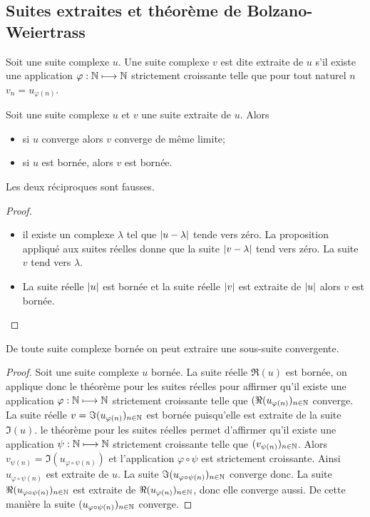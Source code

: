 \subsection{Suites extraites et théorème de Bolzano-Weiertrass}
\begin{defdef}
  Soit une suite complexe \(u\). Une suite complexe \(v\) est dite extraite de \(u\) s'il existe une application \(\varphi:\mathbb{N} \longmapsto \mathbb{N}\) strictement croissante telle que pour tout naturel \(n\) \(v_n=u_{\varphi(n)}\).
\end{defdef}
\begin{prop}
  Soit une suite complexe \(u\) et \(v\) une suite extraite de \(u\). Alors
  \begin{itemize}
  \item si \(u\) converge alors \(v\) converge de même limite;
  \item si \(u\) est bornée, alors \(v\) est bornée.
  \end{itemize}
  Les deux réciproques sont fausses.
\end{prop}
\begin{proof}
  \begin{itemize}
  \item il existe un complexe \(\lambda\) tel que \(\left\lvert u-\lambda\right\rvert\) tende vers zéro. La proposition appliqué aux suites réelles donne que la suite \(\left\lvert v-\lambda\right\rvert\) tend vers zéro. La suite \(v\) tend vers \(\lambda\).
  \item La suite réelle \(\left\lvert u\right\rvert\) est bornée et la suite réelle \(\left\lvert v\right\rvert\) est extraite de \(\left\lvert u\right\rvert\) alors \(v\) est bornée.
  \end{itemize}
\end{proof}
\begin{theo}
  De toute suite complexe bornée on peut extraire une sous-suite convergente.
\end{theo}
\begin{proof}
  Soit une suite complexe \(u\) bornée. La suite réelle \(\Re(u)\) est bornée, on applique donc le théorème pour les suites réelles pour affirmer qu'il existe une application \(\varphi:\mathbb{N} \longmapsto \mathbb{N}\) strictement croissante telle que \((\Re(u_{\varphi(n)})_{n \in \mathbb{N}}\) converge. La suite réelle \(v=\Im(u_{\varphi(n)})_{n \in \mathbb{N}}\) est bornée puisqu'elle est extraite de la suite \(\Im(u)\). le théorème pour les suites réelles permet d'affirmer qu'il existe une application \(\psi:\mathbb{N} \longmapsto \mathbb{N}\) strictement croissante telle que \((v_{\psi(n)})_{n \in \mathbb{N}}\). Alors \(v_{\psi(n)}=\Im(u_{\varphi \circ \psi(n)})\) et l'application \(\varphi \circ \psi\) est strictement croissante. Ainsi \(u_{\varphi \circ \psi(n)}\) est extraite de \(u\). La suite \(\Im(u_{\varphi \circ \psi(n)})_{n \in \mathbb{N}}\) converge donc. La suite \(\Re(u_{\varphi \circ \psi(n)})_{n \in \mathbb{N}}\) est extraite de \(\Re(u_{\varphi(n)})_{n \in \mathbb{N}}\), donc elle converge aussi. De cette manière la suite \((u_{\varphi \circ \psi(n)})_{n \in \mathbb{N}}\) converge.
\end{proof}

